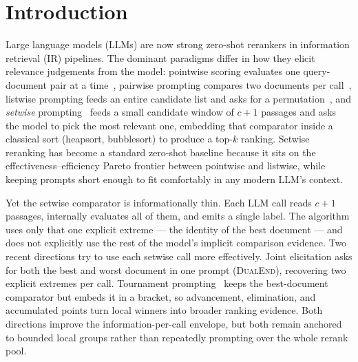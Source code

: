 \section{Introduction}
\label{sec:introduction}

Large language models (LLMs) are now strong zero-shot rerankers in
information retrieval (IR) pipelines. The dominant paradigms differ in how
they elicit relevance judgements from the model: pointwise scoring evaluates
one query-document pair at a time~\citep{nogueira2020monot5}, pairwise
prompting compares two documents per
call~\citep{qin2024prp}, listwise prompting feeds an entire candidate list and
asks for a permutation~\citep{sun2023rankgpt,ma2023zsl}, and
\emph{setwise} prompting~\citep{zhuang2024setwise} feeds a small candidate
window of $c{+}1$ passages and asks the model to pick the most relevant one,
embedding that comparator inside a classical sort (heapsort, bubblesort) to
produce a top-$k$ ranking. Setwise reranking has become a standard
zero-shot baseline because it sits on the effectiveness--efficiency Pareto
frontier between pointwise and listwise, while keeping prompts short enough to
fit comfortably in any modern LLM's context.

Yet the setwise comparator is informationally thin. Each LLM call reads
$c{+}1$ passages, internally evaluates all of them, and emits a single label.
The algorithm uses only that one explicit extreme --- the identity of the best
document --- and does not explicitly use the rest of the model's implicit
comparison evidence. Two recent directions try to use each setwise call more
effectively. Joint elicitation asks for both the best and worst document in
one prompt (\textsc{DualEnd}), recovering two explicit extremes per call.
Tournament prompting~\citep{chen2025tourrank} keeps the best-document
comparator but embeds it in a bracket, so advancement, elimination, and
accumulated points turn local winners into broader ranking evidence. Both
directions improve the information-per-call envelope, but both remain
anchored to bounded local groups rather than repeatedly prompting over the
whole rerank pool.

